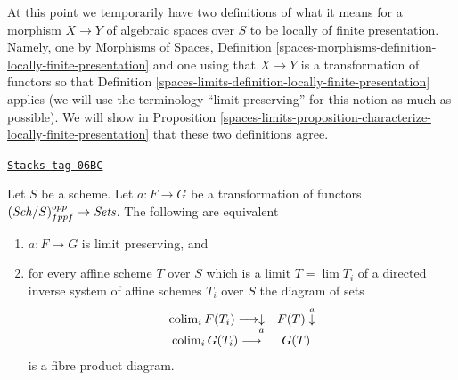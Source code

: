 \medskip\noindent
At this point we temporarily have two definitions of what it means
for a morphism $X \to Y$ of algebraic spaces over $S$ to be locally of finite
presentation. Namely, one by
Morphisms of Spaces,
Definition \ref{spaces-morphisms-definition-locally-finite-presentation}
and one using that $X \to Y$ is a transformation of functors so that
Definition \ref{spaces-limits-definition-locally-finite-presentation}
applies (we will use the terminology ``limit preserving''
for this notion as much as possible). We will show in
Proposition \ref{spaces-limits-proposition-characterize-locally-finite-presentation}
that these two definitions agree.

\begin{lemma}
\label{spaces-limits-lemma-characterize-relative-limit-preserving}
\href{https://stacks.math.columbia.edu/tag/06BC}{\texttt{Stacks tag 06BC}}

Let $S$ be a scheme. Let $a : F \to G$ be a transformation of functors
$(\mathit{Sch}/S)_{fppf}^{opp} \to \textit{Sets}$.
The following are equivalent
\begin{enumerate}
\item $a : F \to G$ is limit preserving, and
\item for every affine scheme $T$ over $S$ which is a
limit $T = \lim T_i$ of a directed inverse system of affine
schemes $T_i$ over $S$ the diagram of sets
$$
\begin{array}{cc}\operatorname{colim}_i F(T_i) \longrightarrow\underset{a}{\downarrow} & F(T) \overset{a}{\downarrow} \\ \operatorname{colim}_i G(T_i) \longrightarrow & G(T)\end{array}
$$
is a fibre product diagram.
\end{enumerate}
\end{lemma}

